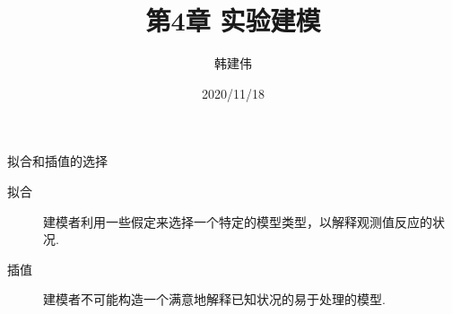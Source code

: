 \documentclass[UTF8]{ctexbeamer}
\title{第4章 实验建模}
\author{韩建伟}
\institute{
  信息学院\\
  \texttt{hanjianwei@zjgsu.du.cn}
}
\date{2020/11/18}
\begin{document}
\begin{frame}[plain]
  \titlepage{}
\end{frame}

\begin{frame}{拟合和插值的选择}

  \begin{description}
  \item[拟合] 建模者利用一些假定来选择一个特定的模型类型，以解释观测值反应的状况.
  \item[插值] 建模者不可能构造一个满意地解释已知状况的易于处理的模型.
  \end{description}

  \begin{figure}
    \centering
  \end{figure}


\end{frame}
\end{document}
